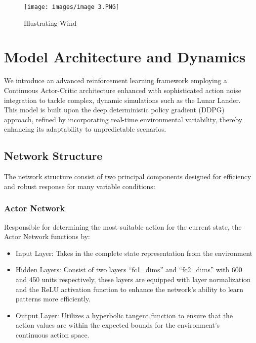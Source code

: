 \documentclass[conference]{IEEEtran}
\begin{document}
\begin{figure}[htp]
    \centering
    \texttt{[image: images/image 3.PNG]}
    \caption{Illustrating Wind}
    \label{fig:Illustrating Wind}
\end{figure}



\section{Model Architecture and Dynamics}
We introduce an advanced reinforcement learning framework employing a Continuous Actor-Critic architecture enhanced with sophisticated action noise integration to tackle complex, dynamic simulations such as the Lunar Lander. This model is built upon the deep deterministic policy gradient (DDPG) approach, refined by incorporating real-time environmental variability, thereby enhancing its adaptability to unpredictable scenarios\cite{zhong2019deep}.

\subsection{Network Structure}
The network structure consist of two principal components designed for efficiency and robust response for many variable conditions:

\subsubsection{Actor Network}
Responsible for determining the most suitable action for the current state, the Actor Network functions by:
\begin{itemize}
    \item Input Layer: Takes in the complete state representation from the environment
    \item Hidden Layers: Consist of two layers “fc1\_dims” and “fc2\_dims” with 600 and 450 units respectively, these layers are equipped with layer normalization and the ReLU activation function to enhance the network’s ability to learn patterns more efficiently.
    \item Output Layer: Utilizes a hyperbolic tangent function to ensure that the action values are within the expected bounds for the environment's continuous action space.
\end{itemize}
    
\end{document}

